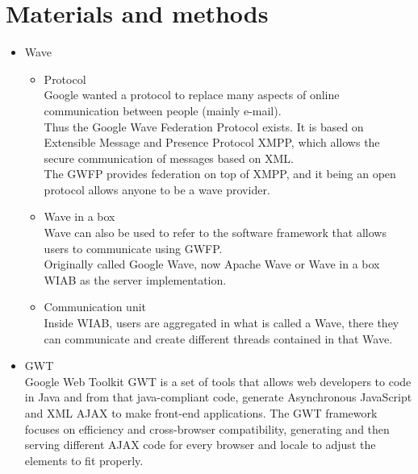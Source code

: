 \newpage
\section{Materials and methods}

\begin{itemize}
  \item Wave

  \begin{itemize}

    Wave can be interpreted as different things

    \item Protocol\\
    Google wanted a protocol to replace many aspects of online communication between people (mainly e-mail).\\
    Thus the Google Wave Federation Protocol exists. It is based on Extensible Message and Presence Protocol XMPP, which allows the secure communication of messages based on XML.\\
    The GWFP provides federation on top of XMPP, and it being an open protocol allows anyone to be a wave provider.
    
    \item Wave in a box\\
    Wave can also be used to refer to the software framework that allows users to communicate using GWFP.\\
    Originally called Google Wave, now Apache Wave or Wave in a box WIAB as the server implementation.

    \item Communication unit\\
    Inside WIAB, users are aggregated in what is called a Wave, there they can communicate and create different threads contained in that Wave.\\

  \end{itemize}

  \item GWT\\
  Google Web Toolkit GWT is a set of tools that allows web developers to code in Java and from that java-compliant code, generate Asynchronous JavaScript and XML AJAX to make front-end applications. The GWT framework focuses on efficiency and cross-browser compatibility, generating and then serving different AJAX code for every browser and locale to adjust the elements to fit properly.


\end{itemize}
